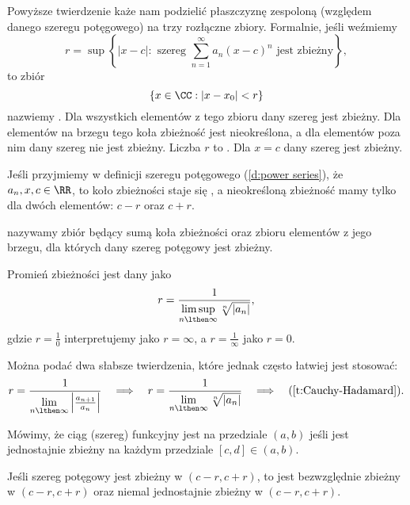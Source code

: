 Powyższe twierdzenie każe nam podzielić płaszczyznę zespoloną (względem danego szeregu potęgowego) na trzy rozłączne zbiory. Formalnie, jeśli weźmiemy
\[ r = \sup\left\{|x - c| : \text{ szereg } \sum_{n=1}^\infty a_n(x - c)^n \text{ jest zbieżny}\right\}, \]
to zbiór
\[ \{x \in \CC : |x - x_0| < r\} \]
nazwiemy . Dla wszystkich elementów z tego zbioru dany szereg jest zbieżny. Dla elementów na brzegu tego koła zbieżność jest nieokreślona, a dla elementów poza nim dany szereg nie jest zbieżny. Liczba $r$ to . Dla $x=c$ dany szereg jest zbieżny.

\begin{remark*}
    Jeśli przyjmiemy w definicji szeregu potęgowego (\ref{d:power series}), że $a_n, x, c \in \RR$, to koło zbieżności staje się , a nieokreśloną zbieżność mamy tylko dla dwóch elementów: $c - r$ oraz $c + r$.
\end{remark*}

 nazywamy zbiór będący sumą koła zbieżności oraz zbioru elementów z jego brzegu, dla których dany szereg potęgowy jest zbieżny. 

\begin{theorem}
    \label{t:Cauchy-Hadamard}
    Promień zbieżności jest dany jako
    \[ r = \frac{1}{\limsup\limits_{n\lthen\infty}\sqrt[n]{|a_n|}}, \]
    gdzie $r = \frac{1}{0}$ interpretujemy jako $r = \infty$, a $r = \frac{1}{\infty}$ jako $r = 0$.
\end{theorem}

Można podać dwa słabsze twierdzenia, które jednak często łatwiej jest stosować:
\[ r = \frac{1}{\lim\limits_{n\lthen\infty} \left|\frac{a_{n+1}}{a_n}\right|} \hspace{1em}\Longrightarrow\hspace{1em} r = \frac{1}{\lim\limits_{n\lthen\infty}\sqrt[n]{|a_n|}} \hspace{1em}\Longrightarrow\hspace{1em} (\ref{t:Cauchy-Hadamard}). \]

Mówimy, że ciąg (szereg) funkcyjny jest  na przedziale $(a, b)$ jeśli jest jednostajnie zbieżny na każdym przedziale $[c, d] \in (a, b)$.

\begin{fact}
    Jeśli szereg potęgowy jest zbieżny w $(c-r, c+r)$, to jest bezwzględnie zbieżny w $(c-r, c+r)$ oraz niemal jednostajnie zbieżny w $(c-r, c+r)$.
\end{fact}


